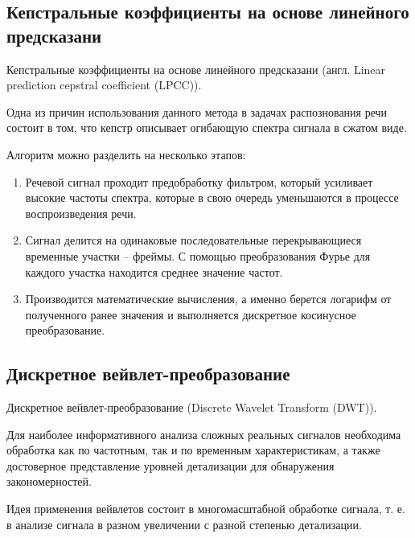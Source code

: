 \subsection{Кепстральные коэффициенты на основе линейного предсказани}
Кепстральные коэффициенты на основе линейного предсказани (англ. Linear prediction cepstral coefficient (LPCC)). 


Одна из причин использования данного метода в задачах распознования речи состоит в том, что кепстр описывает огибающую спектра сигнала в сжатом виде. \cite{methodisb}

Алгоритм можно разделить на несколько этапов:
\begin{enumerate}
	\item Речевой сигнал проходит предобработку фильтром, который усиливает высокие частоты спектра, которые в свою очередь уменьшаются в процессе воспроизведения речи.
	\item Сигнал делится на одинаковые последовательные перекрывающиеся временные участки -- фреймы. С помощью преобразования Фурье для каждого участка находится среднее значение частот.
	\item Производится математические вычисления, а именно берется логарифм от полученного ранее значения и выполняется дискретное косинусное преобразование.
\end{enumerate}
	
\subsection{Дискретное вейвлет-преобразование}
Дискретное вейвлет-преобразование (Discrete Wavelet Transform (DWT)).

Для наиболее информативного анализа сложных реальных сигналов необходима обработка как по частотным, так и по временным характеристикам, а также достоверное представление уровней детализации для обнаружения закономерностей. 

Идея применения вейвлетов состоит в многомасштабной обработке сигнала, т. е. в анализе сигнала в разном увеличении с разной степенью детализации.  \cite{methodisb2}

